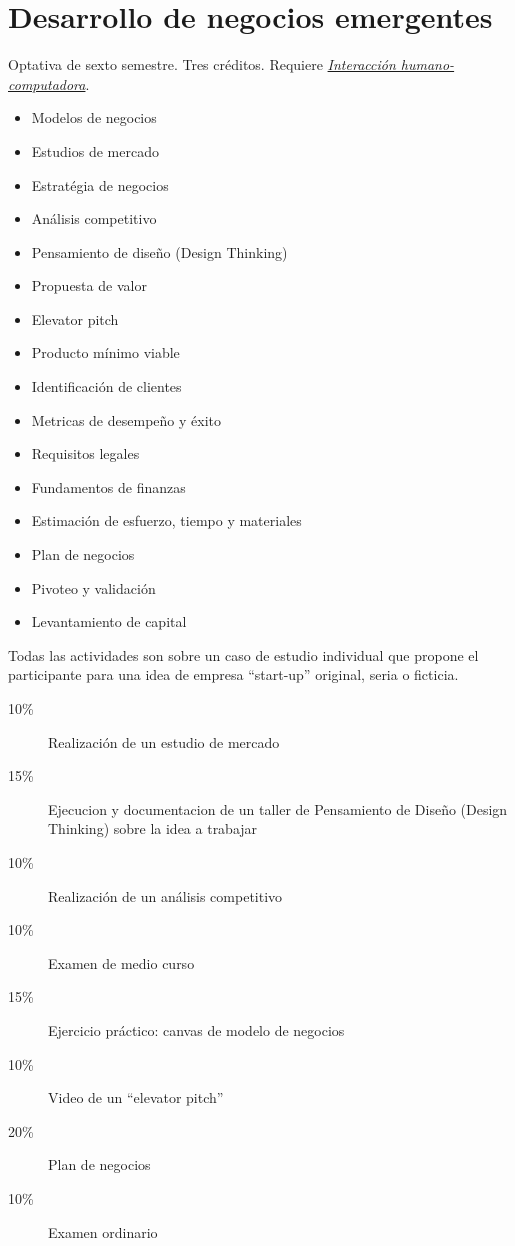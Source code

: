 \documentclass{article}
\begin{document}
\begin{multicols}{4}
\newpage

\hypertarget{pdne}{\section*{Desarrollo de negocios emergentes}}

Optativa de sexto semestre. Tres cr\'{e}ditos. Requiere
\hyperlink{ihc}{\em Interacci\'{o}n humano-computadora}.

\begin{itemize}
\item{Modelos de negocios}
\item{Estudios de mercado}
\item{Estrat\'{e}gia de negocios}
\item{An\'{a}lisis competitivo}
\item{Pensamiento de dise\~{n}o (Design Thinking)}  
\item{Propuesta de valor}
\item{Elevator pitch}
\item{Producto m\'{i}nimo viable}
\item{Identificaci\'{o}n de clientes}
\item{Metricas de desempe\~{n}o y \'{e}xito}
\item{Requisitos legales}
\item{Fundamentos de finanzas}
\item{Estimaci\'{o}n de esfuerzo, tiempo y materiales}
\item{Plan de negocios}
\item{Pivoteo y validaci\'{o}n}
\item{Levantamiento de capital}
\end{itemize}

Todas las actividades son sobre un caso de estudio individual que
propone el participante para una idea de empresa ``start-up''
original, seria o ficticia.

\begin{description}
\item[10\%]{Realizaci\'{o}n de un estudio de mercado}
\item[15\%]{Ejecucion y documentacion de un taller de Pensamiento de Dise\~{n}o (Design Thinking) sobre la idea a trabajar}
\item[10\%]{Realizaci\'{o}n de un an\'{a}lisis competitivo}  
\item[10\%]{Examen de medio curso}  
\item[15\%]{Ejercicio pr\'{a}ctico: canvas de modelo de negocios}
\item[10\%]{Video de un ``elevator pitch''}
\item[20\%]{Plan de negocios}
\item[10\%]{Examen ordinario}
\end{description}  


\end{multicols}
\end{document}
